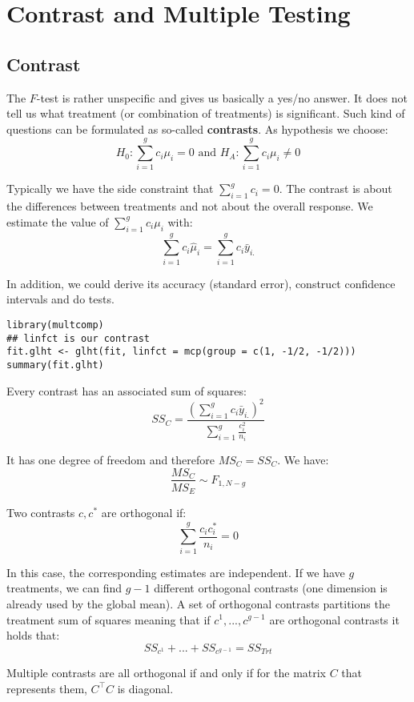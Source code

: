 \section{Contrast and Multiple Testing}

\subsection{Contrast}

The $F$-test is rather unspecific and gives us basically a yes/no answer. It does not tell us what treatment (or combination of treatments) is significant. Such kind of questions can be formulated as so-called \textbf{contrasts}. As hypothesis we choose:
$$H_0 : \sum_{i=1}^g c_i \mu_i = 0 \text{ and } H_A : \sum_{i=1}^g c_i \mu_i \neq 0$$

Typically we have the side constraint that $\sum_{i=1}^g c_i = 0$. The contrast is about the differences between treatments and not about the overall response. We estimate the value of $\sum_{i=1}^g c_i \mu_i$ with:
$$\sum_{i=1}^g c_i \hat \mu_i = \sum_{i=1}^g c_i \bar y_{i.}$$

In addition, we could derive its accuracy (standard error), construct confidence intervals and do tests.

\begin{lstlisting}
library(multcomp)
## linfct is our contrast
fit.glht <- glht(fit, linfct = mcp(group = c(1, -1/2, -1/2)))
summary(fit.glht)
\end{lstlisting}

Every contrast has an associated sum of squares:
$$SS_C = \frac{(\sum_{i=1}^g c_i \bar y_{i.})^2}{\sum_{i=1}^g \frac{c_i^2}{n_i}}$$	

It has one degree of freedom and therefore $MS_C = SS_C$. We have:
$$\frac{MS_C}{MS_E} \sim F_{1, N-g}$$

Two contrasts $c, c^*$ are orthogonal if:
$$\sum_{i=1}^g \frac{c_i c_i^*}{n_i} = 0$$

In this case, the corresponding estimates are independent. If we have $g$ treatments, we can find
$g - 1$ different orthogonal contrasts (one dimension is already used by the global mean). A set of orthogonal contrasts partitions the treatment sum of squares meaning that if
$c^1, ..., c^{g-1}$ are orthogonal contrasts it holds that:
$$SS_{c^1} + ... + SS_{c^{g-1}} = SS_{Trt}$$

Multiple contrasts are all orthogonal if and only if for the matrix $C$ that represents them, $C^\top C$ is diagonal.


